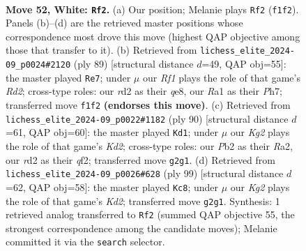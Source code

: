 \documentclass[11pt]{article}
\begin{document}
\clearpage

\begin{figure}[p]\centering
\begin{subfigure}{0.46\textwidth}\centering
\resizebox{\linewidth}{!}{%
\newchessgame
\chessboard[
  setfen={6k1/p7/1p6/2n1Qp1q/P1p5/6P1/1P1r2K1/R4R2 w - - 2 52},
  showmover=false,
  pgfstyle=straightmove, color=movearrow, markmove={f1-f2}
]}
\caption{}
\end{subfigure}\hfill
\begin{subfigure}{0.46\textwidth}\centering
\resizebox{\linewidth}{!}{%
\newchessgame
\chessboard[
  setfen={4Q3/1p1r3p/1P2kp2/8/4p2P/3q2P1/5P2/4R1K1 b - - 6 45},
  showmover=false,
  pgfstyle=straightmove, color=movearrow, markmove={d7-e7}
]}
\caption{}
\end{subfigure}
\\[4pt]
\begin{subfigure}{0.46\textwidth}\centering
\resizebox{\linewidth}{!}{%
\newchessgame
\chessboard[
  setfen={6k1/5p2/6p1/3Q2Pp/1P1P4/r3P3/R2K1q2/8 w - - 0 46},
  showmover=false,
  pgfstyle=straightmove, color=movearrow, markmove={d2-d1}
]}
\caption{}
\end{subfigure}\hfill
\begin{subfigure}{0.46\textwidth}\centering
\resizebox{\linewidth}{!}{%
\newchessgame
\chessboard[
  setfen={8/3k1RQ1/2prr2p/2P4q/8/7P/6PK/8 b - - 0 50},
  showmover=false,
  pgfstyle=straightmove, color=movearrow, markmove={d7-c8}
]}
\caption{}
\end{subfigure}
\caption{\textbf{Move 52, White: \texttt{Rf2}.} (a) Our position; Melanie plays \texttt{Rf2} (\texttt{f1f2}). Panels (b)--(d) are the retrieved master positions whose correspondence most drove this move (highest QAP objective among those that transfer to it). (b) Retrieved from \texttt{lichess\_elite\_2024-09\_p0024\#2120} (ply 89) [structural distance $d$=49, QAP obj=55]: the master played \texttt{Re7}; under $\mu$ our \emph{Rf1} plays the role of that game's \emph{Rd2}; cross-type roles: our \emph{r}d2 as their \emph{q}e8, our \emph{R}a1 as their \emph{P}h7; transferred move \texttt{f1f2} \textbf{(endorses this move)}. (c) Retrieved from \texttt{lichess\_elite\_2024-09\_p0022\#1182} (ply 90) [structural distance $d$=61, QAP obj=60]: the master played \texttt{Kd1}; under $\mu$ our \emph{Kg2} plays the role of that game's \emph{Kd2}; cross-type roles: our \emph{P}b2 as their \emph{R}a2, our \emph{r}d2 as their \emph{q}f2; transferred move \texttt{g2g1}. (d) Retrieved from \texttt{lichess\_elite\_2024-09\_p0026\#628} (ply 99) [structural distance $d$=62, QAP obj=58]: the master played \texttt{Kc8}; under $\mu$ our \emph{Kg2} plays the role of that game's \emph{Kd2}; transferred move \texttt{g2g1}. Synthesis: 1 retrieved analog transferred to \texttt{Rf2} (summed QAP objective 55, the strongest correspondence among the candidate moves); Melanie committed it via the \texttt{search} selector.}
\label{fig:thought-m102}
\end{figure}
\end{document}
